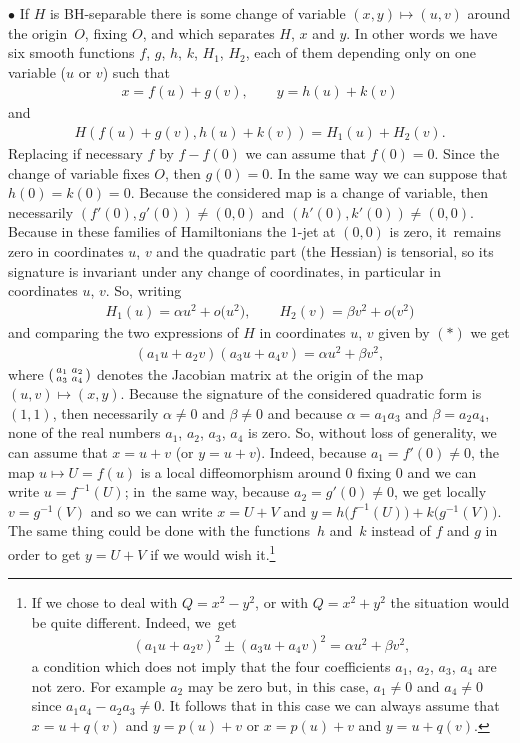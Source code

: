 \documentclass[pdftex]{sigma}%
\numberwithin{equation}{section}
\begin{document}
$\bullet$ If $H$ is BH-separable
there is some change of variable $(x,y)\mapsto (u,v)$ around the origin~$O$, fixing $O$, and which separates $H$, $x$ and $y$. In other words we have six smooth functions $f$, $g$, $h$, $k$, $H_1$, $H_2$, each of them depending only on one variable ($u$ or $v$) such that
\begin{gather*}
x=f(u)+g(v),\qquad y=h(u)+k(v)
\end{gather*}
and
\begin{gather}
H(f(u)+g(v),h(u)+k(v))=H_1(u)+H_2(v)\tag{$*$}.
\end{gather}
Replacing if necessary $f$ by $f-f(0)$ we can assume that $f(0)=0$. Since the change of variable fixes $O$, then $g(0)=0$. In the same way we can suppose that $h(0)=k(0)=0$. Because the considered map is a change of variable, then necessarily $(f'(0),g'(0))\not=(0,0)$ and $(h'(0),k'(0))\not=(0,0)$.
Because in these families of Hamiltonians the $1$-jet at $(0,0)$ is zero, it~remains zero in coordinates $u$, $v$ and the quadratic part (the Hessian) is tensorial, so its signature is invariant under any change of coordinates, in particular in coordinates $u$, $v$. So, writing
\begin{gather*}
H_1(u)=\alpha u^2+o\big(u^2\big),\qquad H_2(v)=\beta v^2+o\big(v^2\big)
\end{gather*}
and comparing the two expressions of $H$ in coordinates $u$, $v$ given by $(*)$ we get
\begin{gather*}
(a_1u+a_2v)(a_3u+a_4v)=\alpha u^2+\beta v^2,
\end{gather*}
where
$\left(\begin{smallmatrix}
a_1&a_2\cr a_3& a_4
\end{smallmatrix}\right)$
denotes the Jacobian matrix at the origin of the map $(u,v)\mapsto(x,y)$.
Because the signature of the considered quadratic form is $(1,1)$, then necessarily $\alpha\not=0$ and $\beta\not=0$ and because $\alpha=a_1a_3$ and $\beta=a_2a_4$, none of the real numbers $a_1$, $a_2$, $a_3$, $a_4$ is zero. So, without loss of generality, we can assume that $x=u+v$ (or $y=u+v$). Indeed, because $a_1=f'(0)\not=0$, the map $u\mapsto U=f(u)$ is a local diffeomorphism around $0$ fixing $0$ and we can write $u=f^{-1}(U)$; in~the same way, because $a_2=g'(0)\not=0$, we get locally $v=g^{-1}(V)$ and so we can write $x=U+V$ and $y=h\big(f^{-1}(U)\big)+k\big(g^{-1}(V)\big)$. The same thing could be done with the functions~$h$ and~$k$ instead of $f$ and $g$ in order to get $y=U+V$ if we would wish it.\footnote{If we chose to deal with $Q=x^2-y^2$, or with $Q=x^2+y^2$ the situation would be quite different. Indeed, we~get
\begin{gather*}
(a_1u+a_2v)^2\pm(a_3u+a_4v)^2=\alpha u^2+\beta v^2,
\end{gather*}
	a condition which does not imply that the four coefficients $a_1$, $a_2$, $a_3$, $a_4$ are not zero. For example $a_2$ may be zero but, in this case, $a_1\not=0$ and $a_4\not=0$ since $a_1a_4-a_2a_3\not=0$. It follows that in this case we can always assume that $x=u+q(v)$ and $y=p(u)+v$ or $x=p(u)+v$ and $y=u+q(v)$.}
\end{document}
